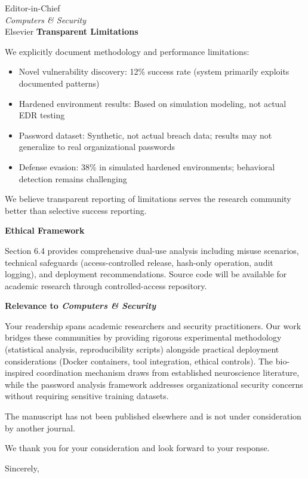 \documentclass[11pt]{letter}
\begin{document}
\begin{letter}{Editor-in-Chief\\
\textit{Computers \& Security}\\
Elsevier}
\textbf{Transparent Limitations}

We explicitly document methodology and performance limitations:
\begin{itemize}
    \item Novel vulnerability discovery: 12\% success rate (system primarily exploits documented patterns)
    \item Hardened environment results: Based on simulation modeling, not actual EDR testing
    \item Password dataset: Synthetic, not actual breach data; results may not generalize to real organizational passwords
    \item Defense evasion: 38\% in simulated hardened environments; behavioral detection remains challenging
\end{itemize}

We believe transparent reporting of limitations serves the research community better than selective success reporting.

\textbf{Ethical Framework}

Section 6.4 provides comprehensive dual-use analysis including misuse scenarios, technical safeguards (access-controlled release, hash-only operation, audit logging), and deployment recommendations. Source code will be available for academic research through controlled-access repository.

\textbf{Relevance to \textit{Computers \& Security}}

Your readership spans academic researchers and security practitioners. Our work bridges these communities by providing rigorous experimental methodology (statistical analysis, reproducibility scripts) alongside practical deployment considerations (Docker containers, tool integration, ethical controls). The bio-inspired coordination mechanism draws from established neuroscience literature, while the password analysis framework addresses organizational security concerns without requiring sensitive training datasets.

The manuscript has not been published elsewhere and is not under consideration by another journal.

We thank you for your consideration and look forward to your response.

\closing{Sincerely,}

\end{letter}
\end{document}
